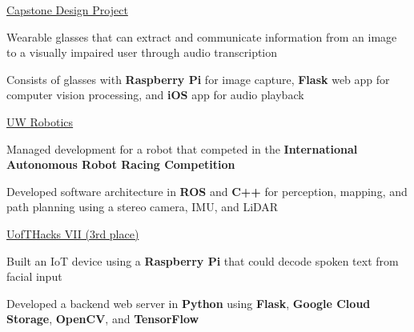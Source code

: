 \documentclass[]{awesome-cv}
\begin{document}
\begin{cventries}
	{\href{https://www.youtube.com/watch?v=aw0gHmt1xBc}{Capstone Design Project}}
	{\begin{cvitems}
		\item {Wearable glasses that can extract and communicate information from an image to a visually impaired user through audio transcription}
		\item {Consists of glasses with \textbf{Raspberry Pi} for image capture, \textbf{Flask} web app for computer vision processing, and \textbf{iOS} app for audio playback}
	\end{cvitems}}
	{\href{https://www.uwaterloorobotics.com}{UW Robotics}}
	{\begin{cvitems}
		\item {Managed development for a robot that competed in the \textbf{International Autonomous Robot Racing Competition}}
		\item {Developed software architecture in \textbf{ROS} and \textbf{C++} for perception, mapping, and path planning using a stereo camera, IMU, and LiDAR}
	\end{cvitems}}
	{\href{https://devpost.com/software/synviz}{UofTHacks VII (3rd place)}}
	{\begin{cvitems}
		\item {Built an IoT device using a \textbf{Raspberry Pi} that could decode spoken text from facial input}
		\item {Developed a backend web server in \textbf{Python} using \textbf{Flask}, \textbf{Google Cloud Storage}, \textbf{OpenCV}, and \textbf{TensorFlow}}
	\end{cvitems}}
\end{cventries}
\end{document}
